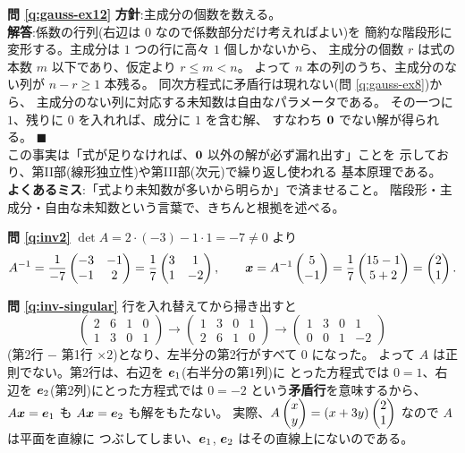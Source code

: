 \bigskip
\noindent\textbf{問 \ref{q:gauss-ex12}}\quad
\textbf{方針}:主成分の個数を数える。\\
\textbf{解答}:係数の行列(右辺は $0$ なので係数部分だけ考えればよい)を
簡約な階段形に変形する。主成分は $1$ つの行に高々 $1$ 個しかないから、
主成分の個数 $r$ は式の本数 $m$ 以下であり、仮定より $r \le m < n$。
よって $n$ 本の列のうち、主成分のない列が $n - r \ge 1$ 本残る。
同次方程式に矛盾行は現れない(問 \ref{q:gauss-ex8})から、
主成分のない列に対応する未知数は自由なパラメータである。
その一つに $1$、残りに $0$ を入れれば、成分に $1$ を含む解、
すなわち $\bm{0}$ でない解が得られる。 $\blacksquare$\\
この事実は「式が足りなければ、$\bm{0}$ 以外の解が必ず漏れ出す」ことを
示しており、第II部(線形独立性)や第III部(次元)で繰り返し使われる
基本原理である。\\
\textbf{よくあるミス}:「式より未知数が多いから明らか」で済ませること。
階段形・主成分・自由な未知数という言葉で、きちんと根拠を述べる。

\bigskip
\noindent\textbf{問 \ref{q:inv2}}\quad
$\det A = 2 \cdot (-3) - 1 \cdot 1 = -7 \neq 0$ より
\[
A^{-1} = \frac{1}{-7}\begin{pmatrix}-3 & -1 \\ -1 & 2\end{pmatrix}
= \frac{1}{7}\begin{pmatrix}3 & 1 \\ 1 & -2\end{pmatrix},
\qquad
\bm{x} = A^{-1}\begin{pmatrix}5 \\ -1\end{pmatrix} = \frac{1}{7}\begin{pmatrix}15 - 1 \\ 5 + 2\end{pmatrix} = \begin{pmatrix}2 \\ 1\end{pmatrix}.
\]

\bigskip
\noindent\textbf{問 \ref{q:inv-singular}}\quad
行を入れ替えてから掃き出すと
\[
\left(\begin{array}{cc|cc}
2 & 6 & 1 & 0 \\
1 & 3 & 0 & 1
\end{array}\right)
\longrightarrow
\left(\begin{array}{cc|cc}
1 & 3 & 0 & 1 \\
2 & 6 & 1 & 0
\end{array}\right)
\longrightarrow
\left(\begin{array}{cc|cc}
1 & 3 & 0 & 1 \\
0 & 0 & 1 & -2
\end{array}\right)
\]
(第2行 $-$ 第1行 $\times 2$)となり、左半分の第2行がすべて $0$ になった。
よって $A$ は正則でない。第2行は、右辺を $\bm{e}_1$(右半分の第1列)に
とった方程式では $0 = 1$、右辺を $\bm{e}_2$(第2列)にとった方程式では
$0 = -2$ という\textbf{矛盾行}を意味するから、
$A\bm{x} = \bm{e}_1$ も $A\bm{x} = \bm{e}_2$ も解をもたない。
実際、$A\begin{pmatrix}x \\ y\end{pmatrix} = (x + 3y)\begin{pmatrix}2 \\ 1\end{pmatrix}$ なので $A$ は平面を直線に
つぶしてしまい、$\bm{e}_1$, $\bm{e}_2$ はその直線上にないのである。

